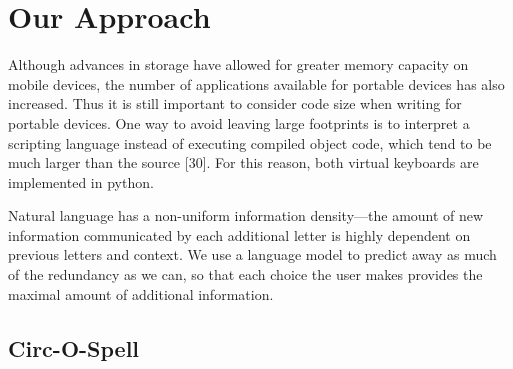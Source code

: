 \documentclass[12pt,titlepage]{article}
\begin{document}
\section{Our Approach}

Although advances in storage have allowed for greater memory capacity on mobile devices, the 
number of applications available for portable devices has also increased.  Thus it is still 
important to consider code size when writing for portable devices.  One way to avoid leaving 
large footprints is to interpret a scripting language instead of executing compiled object code, 
which tend to be much larger than the source [30].  For this reason, both virtual keyboards are 
implemented in python.

Natural language has a non-uniform information density---the amount of new information 
communicated by each additional letter is highly dependent on previous letters and context. 
We use a language model to predict away as much of the redundancy as we can, so that each 
choice the user makes provides the maximal amount of additional information.

\subsection{Circ-O-Spell}
\end{document}
